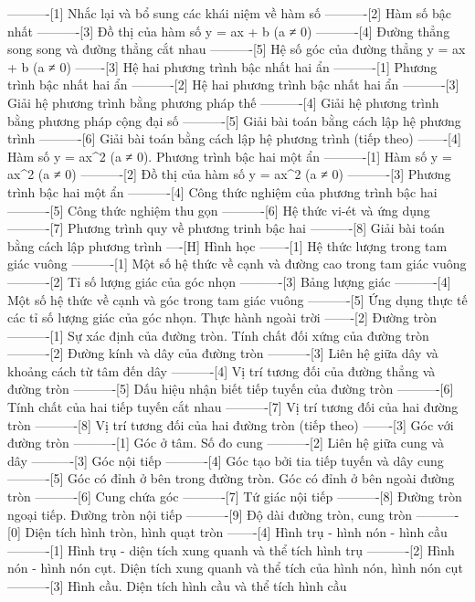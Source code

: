 ----------[1] Nhắc lại và bổ sung các khái niệm về hàm số
----------[2] Hàm số bậc nhất
----------[3] Đồ thị của hàm số y = ax + b (a ≠ 0)
----------[4] Đường thẳng song song và đường thẳng cắt nhau
----------[5] Hệ số góc của đường thẳng y = ax + b (a ≠ 0)
-------[3] Hệ hai phương trình bậc nhất hai ẩn
----------[1] Phương trình bậc nhất hai ẩn
----------[2] Hệ hai phương trình bậc nhất hai ẩn
----------[3] Giải hệ phương trình bằng phương pháp thế
----------[4] Giải hệ phương trình bằng phương pháp cộng đại số
----------[5] Giải bài toán bằng cách lập hệ phương trình
----------[6] Giải bài toán bằng cách lập hệ phương trình (tiếp theo)
-------[4] Hàm số y = ax^2 (a ≠ 0). Phương trình bậc hai một ẩn
----------[1] Hàm số y = ax^2 (a ≠ 0)
----------[2] Đồ thị của hàm số y = ax^2 (a ≠ 0)
----------[3] Phương trình bậc hai một ẩn
----------[4] Công thức nghiệm của phương trình bậc hai
----------[5] Công thức nghiệm thu gọn
----------[6] Hệ thức vi-ét và ứng dụng
----------[7] Phương trình quy về phương trinh bậc hai
----------[8] Giải bài toán bằng cách lập phương trình
----[H] Hình học
-------[1] Hệ thức lượng trong tam giác vuông
----------[1] Một số hệ thức về cạnh và đường cao trong tam giác vuông
----------[2] Tỉ số lượng giác của góc nhọn
----------[3] Bảng lượng giác
----------[4] Một số hệ thức về cạnh và góc trong tam giác vuông
----------[5] Ứng dụng thực tế các tỉ số lượng giác của góc nhọn. Thực hành ngoài trời
-------[2] Đường tròn
----------[1] Sự xác định của đường tròn. Tính chất đối xứng của đường tròn
----------[2] Đường kính và dây của đường tròn
----------[3] Liên hệ giữa dây và khoảng cách từ tâm đến dây
----------[4] Vị trí tương đối của đường thẳng và đường tròn
----------[5] Dấu hiệu nhận biết tiếp tuyến của đường tròn
----------[6] Tính chất của hai tiếp tuyến cắt nhau
----------[7] Vị trí tương đối của hai đường tròn
----------[8] Vị trí tương đối của hai đường tròn (tiếp theo)
-------[3] Góc với đường tròn
----------[1] Góc ở tâm. Số đo cung
----------[2] Liên hệ giữa cung và dây
----------[3] Góc nội tiếp
----------[4] Góc tạo bởi tia tiếp tuyến và dây cung
----------[5] Góc có đỉnh ở bên trong đường tròn. Góc có đỉnh ở bên ngoài đường tròn
----------[6] Cung chứa góc
----------[7] Tứ giác nội tiếp
----------[8] Đường tròn ngoại tiếp. Đường tròn nội tiếp
----------[9] Độ dài đường tròn, cung tròn
----------[0] Diện tích hình tròn, hình quạt tròn
-------[4] Hình trụ - hình nón - hình cầu
----------[1] Hình trụ - diện tích xung quanh và thể tích hình trụ
----------[2] Hình nón - hình nón cụt. Diện tích xung quanh và thể tích của hình nón, hình nón cụt
----------[3] Hình cầu. Diện tích hình cầu và thể tích hình cầu
